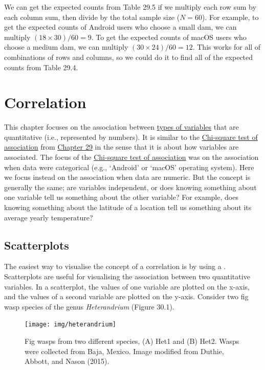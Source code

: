 \documentclass[
  openany]{krantz}
\begin{document}
We can get the expected counts from Table 29.5 if we multiply each row sum by each column sum, then divide by the total sample size (\(N = 60\)).
For example, to get the expected counts of Android users who choose a small dam, we can multiply \((18 \times 30)/60 = 9\).
To get the expected counts of macOS users who choose a medium dam, we can multiply \((30 \times 24)/60 = 12\).
This works for all of combinations of rows and columns, so we could do it to find all of the expected counts from Table 29.4.

\hypertarget{Chapter_30}{%
\chapter{Correlation}\label{Chapter_30}}

This chapter focuses on the association between \protect\hyperlink{Chapter_5}{types of variables} that are quantitative (i.e., represented by numbers).
It is similar to the \protect\hyperlink{chi-squared-test-of-association}{Chi-square test of association} from \protect\hyperlink{Chapter_29}{Chapter 29} in the sense that it is about how variables are associated.
The focus of the \protect\hyperlink{chi-squared-test-of-association}{Chi-square test of association} was on the association when data were categorical (e.g., `Android' or `macOS' operating system).
Here we focus instead on the association when data are numeric.
But the concept is generally the same; are variables independent, or does knowing something about one variable tell us something about the other variable?
For example, does knowing something about the latitude of a location tell us something about its average yearly temperature?

\hypertarget{scatterplots}{%
\section{Scatterplots}\label{scatterplots}}

The easiest way to visualise the concept of a correlation is by using a .
Scatterplots are useful for visualising the association between two quantitative variables.
In a scatterplot, the values of one variable are plotted on the x-axis, and the values of a second variable are plotted on the y-axis.
Consider two fig wasp species of the genus \emph{Heterandrium} (Figure 30.1).

\begin{figure}
\texttt{[image: img/heterandrium]} \caption{Fig wasps from two different species, (A) Het1 and (B) Het2. Wasps were collected from Baja, Mexico. Image modified from Duthie, Abbott, and Nason (2015).}\label{fig:unnamed-chunk-126}
\end{figure}
\end{document}

